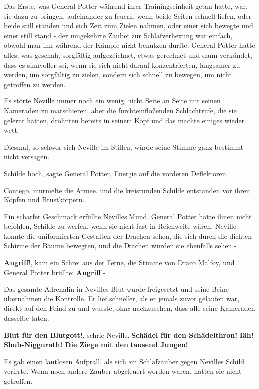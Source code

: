 Das Erste, was General Potter während ihrer Trainingseinheit getan hatte, war,
sie dazu zu bringen, aufeinander zu feuern, wenn beide Seiten schnell liefen,
oder beide still standen und sich Zeit zum Zielen nahmen, oder einer sich
bewegte und einer still stand - der umgekehrte Zauber zur Schlafverhexung war
einfach, obwohl man ihn während der Kämpfe nicht benutzen durfte. General Potter
hatte alles, was geschah, sorgfältig aufgezeichnet, etwas gerechnet und dann
verkündet, dass es sinnvoller sei, wenn sie sich nicht darauf konzentrierten,
langsamer zu werden, um sorgfältig zu zielen, sondern sich schnell zu bewegen,
um nicht getroffen zu werden.

Es störte Neville immer noch ein wenig, nicht Seite an Seite mit seinen
Kameraden zu marschieren, aber die furchteinflößenden Schlachtrufe, die sie
gelernt hatten, dröhnten bereits in seinem Kopf und das machte einiges wieder
wett.

Diesmal, so schwor sich Neville im Stillen, würde seine Stimme ganz bestimmt
nicht versagen.

\glqq{}Schilde hoch\grqq{}, sagte General Potter, \glqq{}Energie auf die
vorderen Deflektoren.\grqq{}

\glqq{}Contego\grqq{}, murmelte die Armee, und die kreisrunden Schilde
entstanden vor ihren Köpfen und Brustkörpern.

Ein scharfer Geschmack erfüllte Nevilles Mund. General Potter hätte ihnen nicht
befohlen, Schilde zu werfen, wenn sie nicht fast in Reichweite wären. Neville
konnte die uniformierten Gestalten der Drachen sehen, die sich durch die dichten
Schirme der Bäume bewegten, und die Drachen würden sie ebenfalls sehen -

\glqq{}\textbf{Angriff}!\grqq{}, kam ein Schrei aus der Ferne, die Stimme von
Draco Malfoy, und General Potter brüllte: \glqq{}\textbf{Angriff} -\grqq{}

Das gesamte Adrenalin in Nevilles Blut wurde freigesetzt und seine Beine
übernahmen die Kontrolle. Er lief schneller, als er jemals zuvor gelaufen war,
direkt auf den Feind zu und wusste, ohne nachzusehen, dass alle seine Kameraden
dasselbe taten.

\glqq{}\textbf{Blut für den Blutgott!}\grqq{}, schrie Neville.
\glqq{}\textbf{Schädel für den Schädelthron!} \textbf{Iäh! Shub-Niggurath!}
\textbf{Die Ziege mit den tausend Jungen!}\grqq{}

Es gab einen lautlosen Aufprall, als sich ein Schlafzauber gegen Nevilles Schild
verirrte. Wenn noch andere Zauber abgefeuert worden waren, hatten sie nicht
getroffen.

